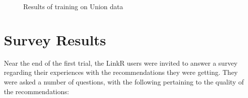 \begin{figure}[h]
\caption{Results of training on Union data}
\end{figure}

\section{Survey Results}

Near the end of the first trial, the LinkR users were invited to answer a survey regarding their experiences with the recommendations they were getting. They were asked a number of questions, with the following pertaining to the quality of the recommendations:

